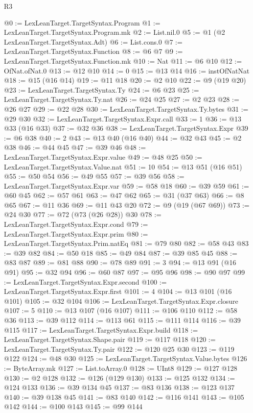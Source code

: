 \begin{lexlean}{R3}
\begin{coremodule}
@0 := LexLeanTarget.TargetSyntax.Program
@1 := LexLeanTarget.TargetSyntax.Program.mk
@2 := List.nil.{0}
@5 := @1 (@2 LexLeanTarget.TargetSyntax.Adt)
@6 := List.cons.{0}
@7 := LexLeanTarget.TargetSyntax.Function
@8 := @6 @7
@9 := LexLeanTarget.TargetSyntax.Function.mk
@10 := Nat
@11 := @6 @10
@12 := OfNat.ofNat.{0}
@13 := @12 @10
@14 := 0
@15 := @13 @14
@16 := instOfNatNat
@18 := @15 (@16 @14)
@19 := @11 @18
@20 := @2 @10
@22 := @9 (@19 @20)
@23 := LexLeanTarget.TargetSyntax.Ty
@24 := @6 @23
@25 := LexLeanTarget.TargetSyntax.Ty.nat
@26 := @24 @25
@27 := @2 @23
@28 := @26 @27
@29 := @22 @28
@30 := LexLeanTarget.TargetSyntax.Ty.bytes
@31 := @29 @30
@32 := LexLeanTarget.TargetSyntax.Expr.call
@33 := 1
@36 := @13 @33 (@16 @33)
@37 := @32 @36
@38 := LexLeanTarget.TargetSyntax.Expr
@39 := @6 @38
@40 := 2
@43 := @13 @40 (@16 @40)
@44 := @32 @43
@45 := @2 @38
@46 := @44 @45
@47 := @39 @46
@48 := LexLeanTarget.TargetSyntax.Expr.value
@49 := @48 @25
@50 := LexLeanTarget.TargetSyntax.Value.nat
@51 := 10
@54 := @13 @51 (@16 @51)
@55 := @50 @54
@56 := @49 @55
@57 := @39 @56
@58 := LexLeanTarget.TargetSyntax.Expr.var
@59 := @58 @18
@60 := @39 @59
@61 := @60 @45
@62 := @57 @61
@63 := @47 @62
@65 := @31 (@37 @63)
@66 := @8 @65
@67 := @11 @36
@69 := @11 @43 @20
@72 := @9 (@19 (@67 @69))
@73 := @24 @30
@77 := @72 (@73 (@26 @28)) @30
@78 := LexLeanTarget.TargetSyntax.Expr.cond
@79 := LexLeanTarget.TargetSyntax.Expr.prim
@80 := LexLeanTarget.TargetSyntax.Prim.natEq
@81 := @79 @80
@82 := @58 @43
@83 := @39 @82
@84 := @50 @18
@85 := @49 @84
@87 := @39 @85 @45
@88 := @83 @87
@89 := @81 @88
@90 := @78 @89
@91 := 3
@94 := @13 @91 (@16 @91)
@95 := @32 @94
@96 := @60 @87
@97 := @95 @96
@98 := @90 @97
@99 := LexLeanTarget.TargetSyntax.Expr.second
@100 := LexLeanTarget.TargetSyntax.Expr.first
@101 := 4
@104 := @13 @101 (@16 @101)
@105 := @32 @104
@106 := LexLeanTarget.TargetSyntax.Expr.closure
@107 := 5
@110 := @13 @107 (@16 @107)
@111 := @106 @110
@112 := @58 @36
@113 := @39 @112
@114 := @113 @61
@115 := @111 @114
@116 := @39 @115
@117 := LexLeanTarget.TargetSyntax.Expr.build
@118 := LexLeanTarget.TargetSyntax.Shape.pair
@119 := @117 @118
@120 := LexLeanTarget.TargetSyntax.Ty.pair
@122 := @120 @25 @30
@123 := @119 @122
@124 := @48 @30
@125 := LexLeanTarget.TargetSyntax.Value.bytes
@126 := ByteArray.mk
@127 := List.toArray.{0}
@128 := UInt8
@129 := @127 @128
@130 := @2 @128
@132 := @126 (@129 @130)
@133 := @125 @132
@134 := @124 @133
@136 := @39 @134 @45
@137 := @83 @136
@138 := @123 @137
@140 := @39 @138 @45
@141 := @83 @140
@142 := @116 @141
@143 := @105 @142
@144 := @100 @143
@145 := @99 @144

\end{coremodule}
\end{lexlean}
